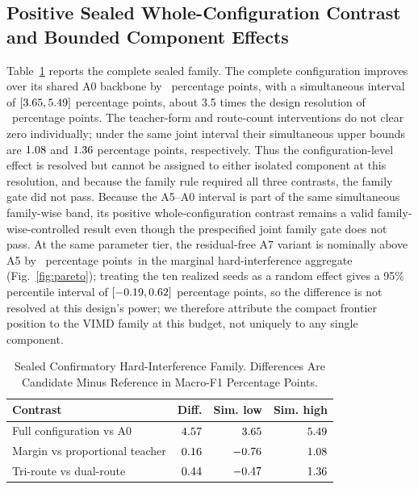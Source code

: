 \documentclass[letterpaper,journal]{IEEEtran}
\newcommand{\pp}{percentage points}
\begin{document}
\subsection{Positive Sealed Whole-Configuration Contrast and Bounded
Component Effects}
Table~\ref{tab:confirmatory} reports the complete sealed family. The complete
configuration improves over its shared A0 backbone by \MethodEffectDiff\ \pp,
with a simultaneous interval of
$[3.65,5.49]$ \pp, about 3.5 times
the design resolution of \DesignResolution\ \pp. The teacher-form and
route-count interventions do not clear zero individually; under the same joint
interval their simultaneous upper bounds are $1.08$ and
$1.36$ \pp, respectively.
Thus the configuration-level effect is resolved but cannot be assigned to
either isolated component at this resolution, and because the family rule
required all three contrasts, the family gate did not pass. Because the
A5--A0 interval is part of the same simultaneous family-wise band, its
positive whole-configuration contrast remains a valid family-wise-controlled
result even though the prespecified joint family gate does not pass. At the same
parameter tier, the residual-free A7 variant is nominally above A5 by
\ASevenVsAFiveHardDiff\ \pp\ in the marginal hard-interference aggregate
(Fig.~\ref{fig:pareto}); treating the ten realized seeds as a random effect
gives a 95\% percentile interval of
$[-0.19,0.62]$ \pp, so the difference is not
resolved at this design's power; we therefore attribute the compact frontier
position to the VIMD family at this budget, not uniquely to any single
component.

\begin{table}[t]
\centering
\caption{Sealed Confirmatory Hard-Interference Family. Differences Are
Candidate Minus Reference in Macro-F1 Percentage Points.}
\label{tab:confirmatory}
\footnotesize
\setlength{\tabcolsep}{3.2pt}
\begin{tabular}{lrrr}
\toprule
Contrast & Diff. & Sim. low & Sim. high\\
\midrule
Full configuration vs A0 & $4.57$ & $3.65$ & $5.49$\\
Margin vs proportional teacher & $0.16$ & $-0.76$ & $1.08$\\
Tri-route vs dual-route & $0.44$ & $-0.47$ & $1.36$\\
\bottomrule
\end{tabular}
\end{table}
\end{document}
